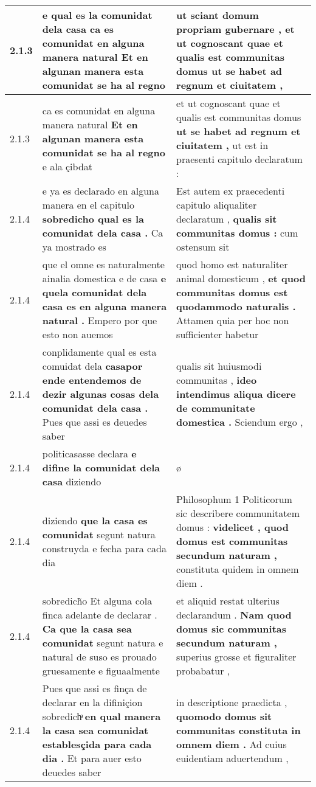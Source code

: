 \begin{tabular}{|p{1cm}|p{6.5cm}|p{6.5cm}|}
2.1.3 & e qual es la comunidat dela casa \textbf{ ca es comunidat en alguna manera natural } Et en algunan manera esta comunidat se ha al regno & ut sciant domum propriam gubernare , \textbf{ et ut cognoscant quae et qualis est communitas domus } ut se habet ad regnum et ciuitatem , \\\hline
2.1.3 & ca es comunidat en alguna manera natural \textbf{ Et en algunan manera esta comunidat se ha al regno } e ala çibdat & et ut cognoscant quae et qualis est communitas domus \textbf{ ut se habet ad regnum et ciuitatem , } ut est in praesenti capitulo declaratum : \\\hline
2.1.4 & e ya es declarado en alguna manera en el capitulo \textbf{ sobredicho qual es la comunidat dela casa . } Ca ya mostrado es & Est autem ex praecedenti capitulo aliqualiter declaratum , \textbf{ qualis sit communitas domus : } cum ostensum sit \\\hline
2.1.4 & que el omne es naturalmente ainalia domestica e de casa \textbf{ e quela comunidat dela casa es en alguna manera natural . } Empero por que esto non auemos & quod homo est naturaliter animal domesticum , \textbf{ et quod communitas domus est quodammodo naturalis . } Attamen quia per hoc non sufficienter habetur \\\hline
2.1.4 & conplidamente qual es esta comuidat dela \textbf{ casapor ende entendemos de dezir algunas cosas dela comunidat dela casa . } Pues que assi es deuedes saber & qualis sit huiusmodi communitas , \textbf{ ideo intendimus aliqua dicere de communitate domestica . } Sciendum ergo , \\\hline
2.1.4 & politicasasse declara \textbf{ e difine la comunidat dela casa } diziendo & ø \\\hline
2.1.4 & diziendo \textbf{ que la casa es comunidat } segunt natura construyda e fecha para cada dia & Philosophum 1 Politicorum sic describere communitatem domus : \textbf{ videlicet , quod domus est communitas secundum naturam , } constituta quidem in omnem diem . \\\hline
2.1.4 & sobredich̃o Et alguna cola finca adelante de declarar . \textbf{ Ca que la casa sea comunidat } segunt natura e natural de suso es prouado gruesamente e figuaalmente & et aliquid restat ulterius declarandum . \textbf{ Nam quod domus sic communitas secundum naturam , } superius grosse et figuraliter probabatur , \\\hline
2.1.4 & Pues que assi es finça de declarar en la difiniçion sobredichͣ \textbf{ en qual manera la casa sea comunidat establesçida para cada dia . } Et para auer esto deuedes saber & in descriptione praedicta , \textbf{ quomodo domus sit communitas constituta in omnem diem . } Ad cuius euidentiam aduertendum , \\\hline

\end{tabular}

